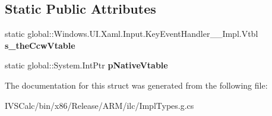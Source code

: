 \subsection*{Static Public Attributes}
\begin{DoxyCompactItemize}
\item 
\mbox{\label{struct_windows_1_1_u_i_1_1_xaml_1_1_input_1_1_key_event_handler_____impl_1_1_vtbl_a500e991f16d1d6a40fcc75b85773570a}} 
static global\+::\+Windows.\+U\+I.\+Xaml.\+Input.\+Key\+Event\+Handler\+\_\+\+\_\+\+Impl.\+Vtbl {\bfseries s\+\_\+the\+Ccw\+Vtable}
\item 
\mbox{\label{struct_windows_1_1_u_i_1_1_xaml_1_1_input_1_1_key_event_handler_____impl_1_1_vtbl_ad3c3e27dc121c6304c89aa953a3eb81a}} 
static global\+::\+System.\+Int\+Ptr {\bfseries p\+Native\+Vtable}
\end{DoxyCompactItemize}


The documentation for this struct was generated from the following file\+:\begin{DoxyCompactItemize}
\item 
I\+V\+S\+Calc/bin/x86/\+Release/\+A\+R\+M/ilc/Impl\+Types.\+g.\+cs\end{DoxyCompactItemize}
